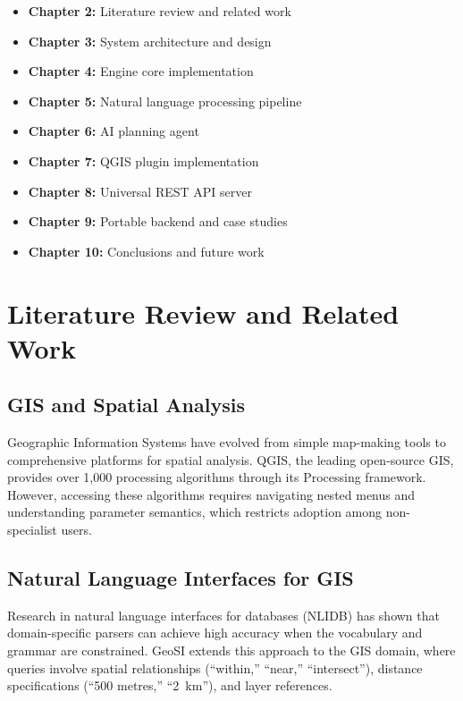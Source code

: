 \documentclass[12pt,a4paper]{report}
\begin{document}
\begin{itemize}
  \item \textbf{Chapter 2:} Literature review and related work
  \item \textbf{Chapter 3:} System architecture and design
  \item \textbf{Chapter 4:} Engine core implementation
  \item \textbf{Chapter 5:} Natural language processing pipeline
  \item \textbf{Chapter 6:} AI planning agent
  \item \textbf{Chapter 7:} QGIS plugin implementation
  \item \textbf{Chapter 8:} Universal REST API server
  \item \textbf{Chapter 9:} Portable backend and case studies
  \item \textbf{Chapter 10:} Conclusions and future work
\end{itemize}

\chapter{Literature Review and Related Work}

\section{GIS and Spatial Analysis}

Geographic Information Systems have evolved from simple map-making tools to comprehensive platforms for spatial analysis.  QGIS, the leading open-source GIS, provides over 1,000 processing algorithms through its Processing framework.  However, accessing these algorithms requires navigating nested menus and understanding parameter semantics, which restricts adoption among non-specialist users.

\section{Natural Language Interfaces for GIS}

Research in natural language interfaces for databases (NLIDB) has shown that domain-specific parsers can achieve high accuracy when the vocabulary and grammar are constrained.  GeoSI extends this approach to the GIS domain, where queries involve spatial relationships (``within,'' ``near,'' ``intersect''), distance specifications (``500 metres,'' ``2~km''), and layer references.
\end{document}
